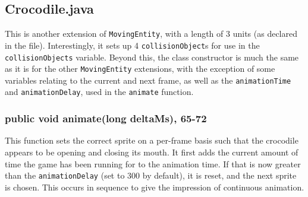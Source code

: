 \documentclass[12pt]{article}
\begin{document}
\subsection{Crocodile.java}
This is another extension of \verb|MovingEntity|, with a length of 3 units (as declared in the file).
Interestingly, it sets up 4 \verb|collisionObject|s for use in the \verb|collisionObjects| variable.
Beyond this, the class constructor is much the same as it is for the other \verb|MovingEntity| extensions, with the exception of some variables relating to the current and next frame, as well as the \verb|animationTime| and \verb|animationDelay|, used in the \verb|animate| function.

\subsubsection{public void animate(long deltaMs), 65-72}
This function sets the correct sprite on a per-frame basis such that the crocodile appears to be opening and closing its mouth.
It first adds the current amount of time the game has been running for to the animation time.
If that is now greater than the \verb|animationDelay| (set to 300 by default), it is reset, and the next sprite is chosen.
This occurs in sequence to give the impression of continuous animation.
\end{document}
